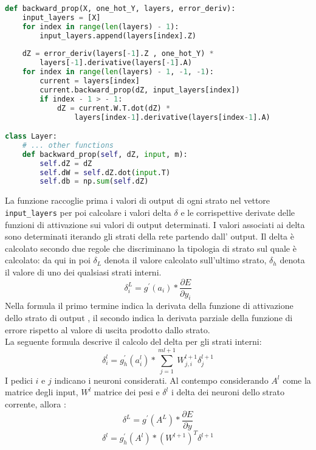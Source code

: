 \begin{lstlisting}[language=Python]
def backward_prop(X, one_hot_Y, layers, error_deriv):
    input_layers = [X]
    for index in range(len(layers) - 1):
        input_layers.append(layers[index].Z)
    
    dZ = error_deriv(layers[-1].Z , one_hot_Y) *
        layers[-1].derivative(layers[-1].A)
    for index in range(len(layers) - 1, -1, -1):
        current = layers[index]
        current.backward_prop(dZ, input_layers[index])
        if index - 1 > - 1:
            dZ = current.W.T.dot(dZ) *
                layers[index-1].derivative(layers[index-1].A)

class Layer:
    # ... other functions
    def backward_prop(self, dZ, input, m):
        self.dZ = dZ
        self.dW = self.dZ.dot(input.T)
        self.db = np.sum(self.dZ)
\end{lstlisting}
La funzione raccoglie prima i valori di output di ogni strato nel vettore \texttt{input\_layers} per poi calcolare i valori delta $\delta$ e le corrispettive derivate delle funzioni di attivazione sui valori di output determinati. I valori associati ai delta sono determinati iterando gli strati della rete partendo dall' output.
Il delta è calcolato secondo due regole che discriminano la tipologia di strato sul quale è calcolato: da qui in poi $\delta_L$ denota il valore calcolato sull'ultimo strato, $\delta_h$ denota il valore di uno dei qualsiasi strati interni.
\begin{equation}
\delta^L_i = g^{\prime}(a_i) * \frac{\partial E}{\partial y_i}
\end{equation}
Nella formula il primo termine indica la derivata della funzione di attivazione dello strato di output , il secondo indica la derivata parziale della funzione di errore rispetto al valore di uscita prodotto dallo strato. \\
La seguente formula descrive il calcolo del delta per gli strati interni:
\begin{equation}
\delta_i^l = g^{\prime}_h(a^l_i) * \sum^{ml+1}_{j=1}{W_{j,i}^{l+1} \delta_j^{l+1}}
\end{equation}
I pedici $i$ e $j$ indicano i neuroni considerati. Al contempo considerando $A^l$ come la matrice degli input, $W^l$ matrice dei pesi e $\delta^l$ i delta dei neuroni dello strato corrente, allora :
\begin{equation}
\delta^L = g^{\prime}(A^L) * \frac{\partial E}{\partial y}
\end{equation}
\begin{equation}
\delta^l = g^{\prime}_h(A^l) * (W^{l+1})^T \delta^{l+1}
\end{equation}
